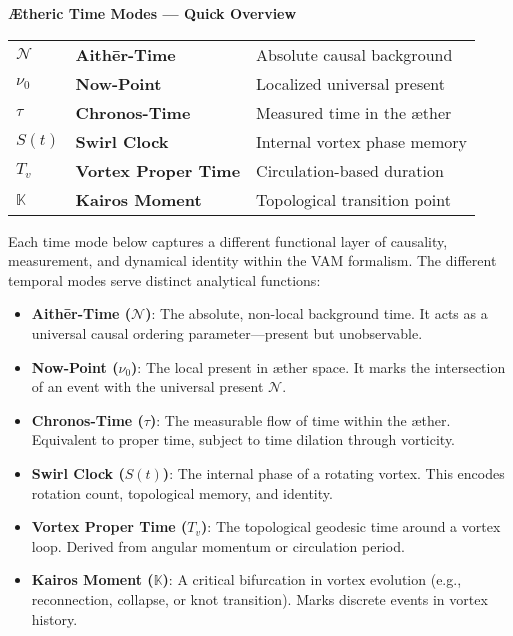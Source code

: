     \begin{center}
        \begin{tcolorbox}[colback=gray!10, colframe=black, width=0.9\textwidth, sharp corners=southwest, boxrule=0.5pt]
            \textbf{Ætheric Time Modes — Quick Overview}
            \vspace{0.5em}

            \begin{tabular}{@{}p{1.5cm}p{5.2cm}p{6cm}@{}}
                \(\mathcal{N}\)     & \textbf{Aithēr-Time}         & Absolute causal background \\
                \(\nu_0\)           & \textbf{Now-Point}           & Localized universal present \\
                \(\tau\)            & \textbf{Chronos-Time}        & Measured time in the æther \\
                \(S(t)\)            & \textbf{Swirl Clock}         & Internal vortex phase memory \\
                \(T_v\)             & \textbf{Vortex Proper Time}  & Circulation-based duration \\
                \(\mathbb{K}\)      & \textbf{Kairos Moment}       & Topological transition point \\
            \end{tabular}
        \end{tcolorbox}
    \end{center}



    Each time mode below captures a different functional layer of causality, measurement, and dynamical identity within the VAM formalism. The different temporal modes serve distinct analytical functions:

    \begin{itemize}
        \item \textbf{Aithēr-Time (\( \mathcal{N} \))}: The absolute, non-local background time. It acts as a universal causal ordering parameter—present but unobservable.
        \item \textbf{Now-Point (\( \nu_0 \))}: The local present in æther space. It marks the intersection of an event with the universal present \( \mathcal{N} \).
        \item \textbf{Chronos-Time (\( \tau \))}: The measurable flow of time within the æther. Equivalent to proper time, subject to time dilation through vorticity.
        \item \textbf{Swirl Clock (\( S(t) \))}: The internal phase of a rotating vortex. This encodes rotation count, topological memory, and identity.
        \item \textbf{Vortex Proper Time (\( T_v \))}: The topological geodesic time around a vortex loop. Derived from angular momentum or circulation period.
        \item \textbf{Kairos Moment (\( \mathbb{K} \))}: A critical bifurcation in vortex evolution (e.g., reconnection, collapse, or knot transition). Marks discrete events in vortex history.
    \end{itemize}

